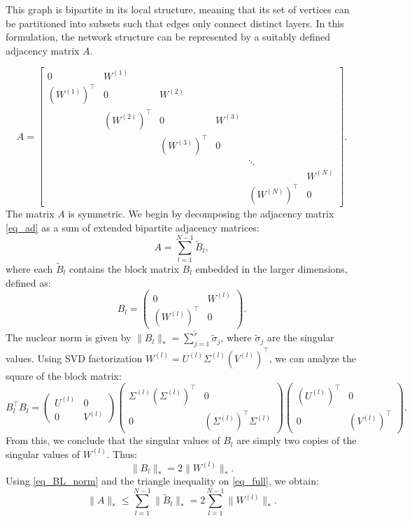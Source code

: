 \documentclass[a4paper,fleqn]{cas-sc}
\theoremstyle{remark}
\theoremstyle{definition}
\begin{document}
This graph is bipartite in its local structure, meaning that its set of vertices can be partitioned into subsets such that edges only connect distinct layers. In this formulation, the network structure can be represented by a suitably defined adjacency matrix $A$.

\begin{equation}\label{eq_ad}
    A=\begin{bmatrix}
     0&W^{(1)}&\\
     (W^{(1)})^\top&0&W^{(2)}\\
     &(W^{(2)})^\top&0&W^{(3)}\\
     &&(W^{(3)})^\top&0\\
     &&&&\ddots\\
     &&&&&W^{(N)}\\
     &&&&(W^{(N)})^\top&0
    \end{bmatrix}.
\end{equation}
The matrix $A$ is symmetric. We begin by decomposing the adjacency matrix \eqref{eq_ad} as a sum of extended bipartite adjacency matrices:
\begin{equation}\label{eq_full}
A = \sum_{l=1}^{N-1} \widetilde{B}_l,    
\end{equation}
where each $\widetilde{B}_l$ contains the block matrix $B_l$ embedded in the larger dimensions, defined as:
\begin{equation}\label{eq_BL}
B_l = \begin{pmatrix} 0 & W^{(l)} \\ (W^{(l)})^\top & 0 \end{pmatrix}.
\end{equation}
The nuclear norm is given by $\|B_l\|_* = \sum_{j=1}^{\tilde{r}}\tilde{\sigma}_j$, where $\tilde{\sigma}_j$ are the singular values. Using SVD factorization $W^{(l)}=U^{(l)}\Sigma^{(l)} (V^{(l)})^\top$, we can analyze the square of the block matrix:
\begin{equation}
B_l^\top B_l = 
\begin{pmatrix} 
U^{(l)} & 0 \\ 
0 & V^{(l)} 
\end{pmatrix}
\begin{pmatrix} 
\Sigma^{(l)}(\Sigma^{(l)})^\top & 0 \\ 
 0 & (\Sigma^{(l)})^\top\Sigma^{(l)} 
\end{pmatrix}
\begin{pmatrix} 
(U^{(l)})^\top & 0 \\ 
0 & (V^{(l)})^\top 
\end{pmatrix}.
\end{equation}
From this, we conclude that the singular values of $B_l$ are simply two copies of the singular values of $W^{(l)}$. Thus:
\begin{equation}\label{eq_BL_norm}
\|B_l\|_* = 2\|W^{(l)}\|_*.
\end{equation}
Using \eqref{eq_BL_norm} and the triangle inequality on \eqref{eq_full}, we obtain:
\begin{equation}\label{eq_full_2}
\|A\|_* \leq \sum_{l=1}^{N-1} \|\widetilde{B}_l\|_* = 2\sum_{l=1}^{N-1} \|W^{(l)}\|_*.    
\end{equation}
\end{document}
